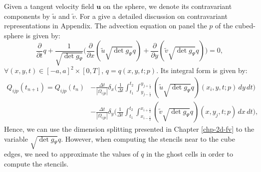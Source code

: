 Given a tangent velocity field $\boldsymbol{u}$ on the sphere, we denote its
contravariant components by $\tilde{u}$ and $\tilde{v}$.
For a give a detailed discussion on contravariant representations in Appendix.
The advection equation on panel the $p$ of the cubed-sphere is given by:
\begin{equation*}
	\frac{\partial}{\partial t}{q}+
	\frac{1}{\sqrt{\det{g_{\Psi}}}}\bigg(
	\frac{\partial}{\partial x} {(\tilde{u}\sqrt{\det{g_{\Psi}}}q)}+
	\frac{\partial}{\partial y} {(\tilde{v}\sqrt{\det{g_{\Psi}}}q)}
	\bigg)
	= 0,
\end{equation*}
$\forall (x,y,t) \in [-a,a]^2\times[0,T]$, $q = {q}(x,y,t;p)$.
Its integral form is given by:
\begin{align*}
	{Q}_{ijp}(t_{n+1})  = {Q}_{ijp}(t_{n})
	&- \frac{\Delta t}{|\Omega_{ijp}|}
	\delta _x \bigg( \frac{1}{\Delta t}
	\int_{t_1}^{t_2} \int_{y_{j-\frac{1}{2}}}^{y_{j+\frac{1}{2}}}
	{(\tilde{u}\sqrt{\det{g_{\Psi}}}q)}(x_{i}, y, t;p)
	\,dy \,dt \bigg) \\ \nonumber
	&- \frac{\Delta t}{|\Omega_{ijp}|}
	\delta _y \bigg( \frac{1}{\Delta t}
	\int_{t_1}^{t_2} \int_{x_{i-\frac{1}{2}}}^{x_{i+\frac{1}{2}}}
	{(\tilde{v}\sqrt{\det{g_{\Psi}}}q)}(x, y_{j}, t;p)
	\,dx \,dt \bigg),
\end{align*}
Hence, we can use the dimension splitting presented in Chapter \ref{chp-2d-fv}
to the variable $\sqrt{\det{g_{\Psi}}}q$.
However, when computing the stencils near to the cube edges,
we need to approximate the values of $q$ in the ghost cells in order to compute
the stencils.